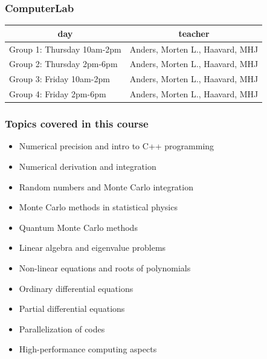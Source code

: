 \documentclass{beamer}
\begin{document}
\begin{frame}
\frametitle{ComputerLab}

\begin{block}{}


{\footnotesize
\begin{tabular}{ll}
\hline
\multicolumn{1}{c}{ day } & \multicolumn{1}{c}{ teacher } \\
\hline
Group 1: Thursday 10am-2pm & Anders, Morten L., Haavard, MHJ \\
Group 2: Thursday 2pm-6pm  & Anders, Morten L., Haavard, MHJ \\
Group 3: Friday 10am-2pm   & Anders, Morten L., Haavard, MHJ \\
Group 4: Friday 2pm-6pm    & Anders, Morten L., Haavard, MHJ \\
\hline
\end{tabular}
}

\noindent
\end{block}
\end{frame}

\begin{frame}
\frametitle{Topics covered in this course}

\begin{block}{}
\begin{itemize}
  \item Numerical precision and intro to C++ programming

  \item Numerical derivation and integration

  \item Random numbers and Monte Carlo integration

  \item Monte Carlo methods in statistical physics

  \item Quantum Monte Carlo methods

  \item Linear algebra and eigenvalue problems

  \item Non-linear equations and roots of polynomials

  \item Ordinary differential equations

  \item Partial differential equations

  \item Parallelization of codes

  \item High-performance computing aspects
\end{itemize}

\noindent
\end{block}
\end{frame}
\end{document}
